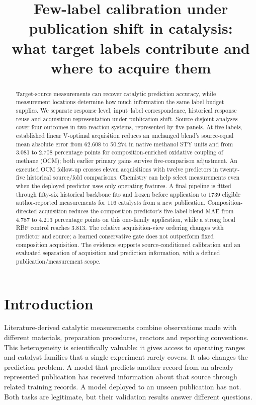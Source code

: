 \documentclass[11pt]{article}
\title{Few-label calibration under publication shift in catalysis:\\what target labels contribute and where to acquire them}
\author{}
\date{}
\begin{document}
\maketitle
\begin{abstract}
Target-source measurements can recover catalytic prediction accuracy, while measurement locations determine how much information the same label budget supplies. We separate response level, input--label correspondence, historical response reuse and acquisition representation under publication shift. Source-disjoint analyses cover four outcomes in two reaction systems, represented by five panels. At five labels, established linear V-optimal acquisition reduces an unchanged blend's source-equal mean absolute error from 62.608 to 50.274 in native methanol STY units and from 3.081 to 2.708 percentage points for composition-enriched oxidative coupling of methane (OCM); both earlier primary gains survive five-comparison adjustment. An executed OCM follow-up crosses eleven acquisitions with twelve predictors in twenty-five historical source/fold comparisons. Chemistry can help select measurements even when the deployed predictor uses only operating features. A final pipeline is fitted through fifty-six historical backbone fits and frozen before application to 1739 eligible author-reported measurements for 116 catalysts from a new publication. Composition-directed acquisition reduces the composition predictor's five-label blend MAE from 4.787 to 4.213 percentage points on this one-family application, while a strong local RBF control reaches 3.813. The relative acquisition-view ordering changes with predictor and source; a learned conservative gate does not outperform fixed composition acquisition. The evidence supports source-conditioned calibration and an evaluated separation of acquisition and prediction information, with a defined publication/measurement scope.
\end{abstract}

\section{Introduction}
Literature-derived catalytic measurements combine observations made with different materials, preparation procedures, reactors and reporting conventions. This heterogeneity is scientifically valuable: it gives access to operating ranges and catalyst families that a single experiment rarely covers. It also changes the prediction problem. A model that predicts another record from an already represented publication has received information about that source through related training records. A model deployed to an unseen publication has not. Both tasks are legitimate, but their validation results answer different questions.
\end{document}
